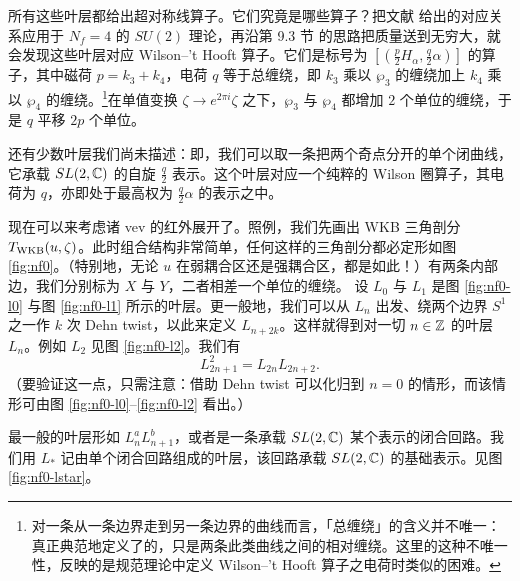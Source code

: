 所有这些叶层都给出超对称线算子。它们究竟是哪些算子？把文献 \cite{Drukker:2009tz} 给出的对应关系应用于 $N_f = 4$ 的 $SU(2)$ 理论，再沿第 9.3 节%
的思路把质量送到无穷大，就会发现这些叶层对应 Wilson--'t Hooft 算子。它们是标号为 $[(\frac{p}{2} H_\alpha , \frac{q}{2} \alpha)]$ 的算子，其中磁荷 $p = k_3 + k_4$，电荷 $q$ 等于总缠绕，即 $k_3$ 乘以 $\wp_3$ 的缠绕加上 $k_4$ 乘以 $\wp_4$ 的缠绕。\footnote{对一条从一条边界走到另一条边界的曲线而言，「总缠绕」的含义并不唯一：真正典范地定义了的，只是两条此类曲线之间的相对缠绕。这里的这种不唯一性，反映的是规范理论中定义 Wilson--'t Hooft 算子之电荷时类似的困难。}在单值变换 $\zeta \to e^{2 \pi i} \zeta$ 之下，$\wp_3$ 与 $\wp_4$ 都增加 $2$ 个单位的缠绕，于是 $q$ 平移 $2p$ 个单位。

还有少数叶层我们尚未描述：即，我们可以取一条把两个奇点分开的单个闭曲线，它承载 $SL(2,\mathbb{C})$ 的自旋 $\frac{q}{2}$ 表示。这个叶层对应一个纯粹的 Wilson 圈算子，其电荷为 $q$，亦即处于最高权为 $\frac{q}{2} \alpha$ 的表示之中。

现在可以来考虑诸 vev 的红外展开了。照例，我们先画出 WKB 三角剖分 $T_{\rm WKB}(u, \zeta)$。此时组合结构非常简单，任何这样的三角剖分都必定形如图 \ref{fig:nf0}。（特别地，无论 $u$ 在弱耦合区还是强耦合区，都是如此！）有两条内部边，我们分别标为 $X$ 与 $Y$，二者相差一个单位的缠绕。
%
设 $L_0$ 与 $L_1$ 是图 \ref{fig:nf0-l0} 与图 \ref{fig:nf0-l1} 所示的叶层。更一般地，我们可以从 $L_n$ 出发、绕两个边界 $S^1$ 之一作 $k$ 次 Dehn twist，以此来定义 $L_{n+2k}$。这样就得到对一切 $n \in \mathbb{Z}$ 的叶层 $L_n$。例如 $L_2$ 见图 \ref{fig:nf0-l2}。我们有
\begin{equation}
L_{2n+1}^2 = L_{2n} L_{2n+2}.
\end{equation}
（要验证这一点，只需注意：借助 Dehn twist 可以化归到 $n=0$ 的情形，而该情形可由图 \ref{fig:nf0-l0}--\ref{fig:nf0-l2} 看出。）

最一般的叶层形如 $L_n^a L_{n+1}^b$，或者是一条承载 $SL(2,\mathbb{C})$ 某个表示的闭合回路。我们用 $L_*$ 记由单个闭合回路组成的叶层，该回路承载 $SL(2,\mathbb{C})$ 的基础表示。见图 \ref{fig:nf0-lstar}。

